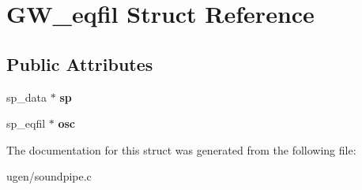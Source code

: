 \hypertarget{structGW__eqfil}{}\section{G\+W\+\_\+eqfil Struct Reference}
\label{structGW__eqfil}
\subsection*{Public Attributes}
\begin{DoxyCompactItemize}
\item 
\hypertarget{structGW__eqfil_a15415290fc30bc2e9b5f817d62e05767}{}\label{structGW__eqfil_a15415290fc30bc2e9b5f817d62e05767} 
sp\+\_\+data $\ast$ {\bfseries sp}
\item 
\hypertarget{structGW__eqfil_acaded8e429f3b9b6ef140b3e870acd94}{}\label{structGW__eqfil_acaded8e429f3b9b6ef140b3e870acd94} 
sp\+\_\+eqfil $\ast$ {\bfseries osc}
\end{DoxyCompactItemize}


The documentation for this struct was generated from the following file\+:\begin{DoxyCompactItemize}
\item 
ugen/soundpipe.\+c\end{DoxyCompactItemize}
